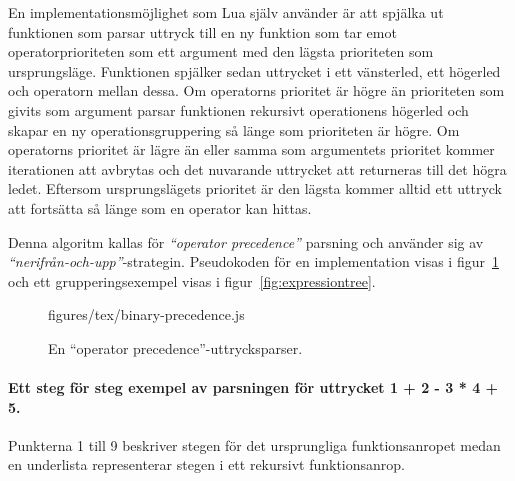 En implementationsmöjlighet som Lua själv använder är att spjälka ut
funktionen som parsar uttryck till en ny funktion som tar emot
operatorprioriteten som ett argument med den lägsta prioriteten som
ursprungsläge. Funktionen spjälker sedan uttrycket i ett vänsterled, ett
högerled och operatorn mellan dessa. Om operatorns prioritet är högre än
prioriteten som givits som argument parsar funktionen rekursivt operationens
högerled och skapar en ny operationsgruppering så länge som prioriteten är
högre. Om operatorns prioritet är lägre än eller samma som argumentets
prioritet kommer iterationen att avbrytas och det nuvarande uttrycket att
returneras till det högra ledet. Eftersom ursprungslägets prioritet är den
lägsta kommer alltid ett uttryck att fortsätta så länge som en operator kan
hittas.

Denna algoritm kallas för \textit{``operator precedence''} parsning och
använder sig av \textit{``nerifrån-och-upp''}-strategin. Pseudokoden för en
implementation visas i figur~\ref{fig:binprecedence} och ett
grupperingsexempel visas i figur~\ref{fig:expressiontree}.

\begin{figure}
    {figures/tex/binary-precedence.js}
  \caption{En ``operator precedence''-uttrycksparser.}
  \label{fig:binprecedence}
\end{figure}

\paragraph{Ett steg för steg exempel av parsningen för uttrycket 1 + 2 - 3 * 4
+ 5.}
\hfill

Punkterna 1 till 9 beskriver stegen för det ursprungliga funktionsanropet medan
en underlista representerar stegen i ett rekursivt funktionsanrop.

